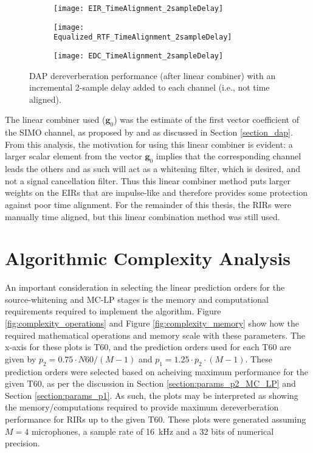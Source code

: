 \begin{figure}[H]
	\centering
	\begin{subfigure}[b]{0.32\textwidth}
		\centering
		\texttt{[image: EIR\_TimeAlignment\_2sampleDelay]}
	\end{subfigure}
	\hfill
	\begin{subfigure}[b]{0.32\textwidth}
		\centering
		\texttt{[image: Equalized\_RTF\_TimeAlignment\_2sampleDelay]}
	\end{subfigure}
	\hfill
	\begin{subfigure}[b]{0.32\textwidth}
		\centering
		\texttt{[image: EDC\_TimeAlignment\_2sampleDelay]}
	\end{subfigure}
	\hfill
	\caption[DAP dereverberation performance for non time-aligned RIRs]{DAP dereverberation performance (after linear combiner) with an incremental 2-sample delay added to each channel (i.e., not time aligned).}
	\label{fig:params_TimeAlignment_2sampleDelay}
\end{figure}

The linear combiner used ($\boldsymbol{g}_0$) was the estimate of the first vector coefficient of the SIMO channel, as proposed by \cite{triki2006delay} and as discussed in Section \ref{section_dap}. From this analysis, the motivation for using this linear combiner is evident: a larger scalar element from the vector $\boldsymbol{g}_0$ implies that the corresponding channel leads the others and as such will act as a whitening filter, which is desired, and not a signal cancellation filter. Thus this linear combiner method puts larger weights on the EIRs that are impulse-like and therefore provides some protection against poor time alignment. For the remainder of this thesis, the RIRs were manually time aligned, but this linear combination method was still used.

\section{Algorithmic Complexity Analysis} \label{section:complexity}

An important consideration in selecting the linear prediction orders for the source-whitening and MC-LP stages is the memory and computational requirements required to implement the algorithm. Figure \ref{fig:complexity_operations} and Figure \ref{fig:complexity_memory} show how the required mathematical operations and memory scale with these parameters. The x-axis for these plots is T60, and the prediction orders used for each T60 are given by $p_2 = 0.75 \cdot N60 / \left(M-1\right)$ and $p_1 = 1.25 \cdot p_2 \cdot \left(M-1\right)$. These prediction orders were selected based on acheiving maximum performance for the given T60, as per the discussion in Section \ref{section:params_p2_MC_LP} and Section \ref{section:params_p1}. As such, the plots may be interpreted as showing the memory/computations required to provide maximum dereverberation performance for RIRs up to the given T60. These plots were generated assuming $M=4$ microphones, a sample rate of \qty{16}{\kilo\hertz} and a 32 bits of numerical precision.

